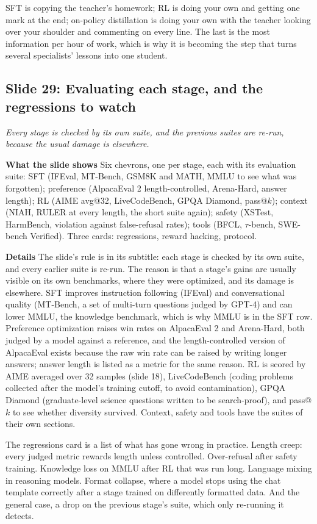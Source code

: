 \documentclass[11pt,letterpaper]{article}
\newcommand{\slide}[3]{%
  \subsection[Slide #1: #2]{Slide #1: #2}%
  {\color{muted}\itshape #3\par}\medskip}
\newcommand{\para}[1]{\medskip\noindent\textbf{#1}\quad}
\newenvironment{intuition}{\begin{tcolorbox}[intuitionbox]}{\end{tcolorbox}}
\begin{document}
\begin{intuition}
SFT is copying the teacher's homework; RL is doing your own and getting one mark at the end; on-policy distillation is doing your own with the teacher looking over your shoulder and commenting on every line. The last is the most information per hour of work, which is why it is becoming the step that turns several specialists' lessons into one student.
\end{intuition}

\slide{29}{Evaluating each stage, and the regressions to watch}{Every stage is checked by its own suite, and the previous suites are re-run, because the usual damage is elsewhere.}

\para{What the slide shows} Six chevrons, one per stage, each with its evaluation suite: SFT (IFEval, MT-Bench, GSM8K and MATH, MMLU to see what was forgotten); preference (AlpacaEval 2 length-controlled, Arena-Hard, answer length); RL (AIME avg@32, LiveCodeBench, GPQA Diamond, pass@$k$); context (NIAH, RULER at every length, the short suite again); safety (XSTest, HarmBench, violation against false-refusal rates); tools (BFCL, $\tau$-bench, SWE-bench Verified). Three cards: regressions, reward hacking, protocol.

\para{Details} The slide's rule is in its subtitle: each stage is checked by its own suite, and every earlier suite is re-run. The reason is that a stage's gains are usually visible on its own benchmarks, where they were optimized, and its damage is elsewhere. SFT improves instruction following (IFEval) and conversational quality (MT-Bench, a set of multi-turn questions judged by GPT-4) and can lower MMLU, the knowledge benchmark, which is why MMLU is in the SFT row. Preference optimization raises win rates on AlpacaEval 2 and Arena-Hard, both judged by a model against a reference, and the length-controlled version of AlpacaEval exists because the raw win rate can be raised by writing longer answers; answer length is listed as a metric for the same reason. RL is scored by AIME averaged over 32 samples (slide 18), LiveCodeBench (coding problems collected after the model's training cutoff, to avoid contamination), GPQA Diamond (graduate-level science questions written to be search-proof), and pass@$k$ to see whether diversity survived. Context, safety and tools have the suites of their own sections.

The regressions card is a list of what has gone wrong in practice. Length creep: every judged metric rewards length unless controlled. Over-refusal after safety training. Knowledge loss on MMLU after RL that was run long. Language mixing in reasoning models. Format collapse, where a model stops using the chat template correctly after a stage trained on differently formatted data. And the general case, a drop on the previous stage's suite, which only re-running it detects.
\end{document}

